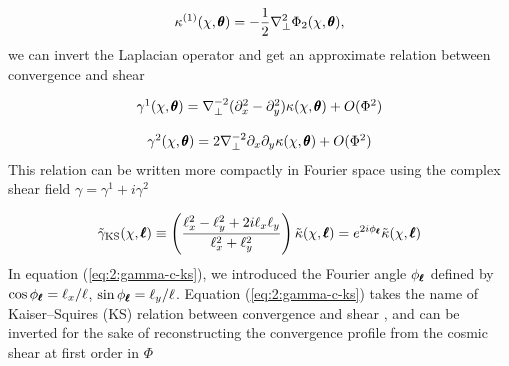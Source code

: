 \begin{equation}
\label{eq:2:kappa-1-lapl}
\kappa^{(1)}(\chi,\pmb{\theta}) = -\frac{1}{2}\nabla_\perp^2 \Phi_2(\chi,\pmb{\theta}),
\end{equation}
%
we can invert the Laplacian operator and get an approximate relation between convergence and shear

\begin{equation}
\label{eq:2:gamma-1-lapl}
\begin{matrix}
\gamma^1(\chi,\pmb{\theta}) = \nabla_\perp^{-2} (\partial_x^2-\partial_y^2) \kappa(\chi,\pmb{\theta}) + O(\Phi^2) \\ \\
\gamma^2(\chi,\pmb{\theta}) = 2\nabla_\perp^{-2} \partial_x\partial_y \kappa(\chi,\pmb{\theta}) + O(\Phi^2)
\end{matrix}
\end{equation}
%
This relation can be written more compactly in Fourier space using the complex shear field $\gamma=\gamma^1+i\gamma^2$  

\begin{equation}
\label{eq:2:gamma-c-ks}
\tilde{\gamma}_{\rm KS}(\chi,\pmb{\ell}) \equiv \left(\frac{\ell_x^2-\ell_y^2+2i\ell_x\ell_y}{\ell_x^2+\ell_y^2}\right) \tilde{\kappa}(\chi,\pmb{\ell}) = e^{2i\phi_{\pmb{\ell}}} \tilde{\kappa}(\chi,\pmb{\ell})
\end{equation}
%
In equation (\ref{eq:2:gamma-c-ks}), we introduced the Fourier angle $\phi_{\pmb{\ell}}$ defined by $\cos \phi_{\pmb{\ell}} = \ell_x/\ell$, $\sin\phi_{\pmb{\ell}}=\ell_y/\ell$. Equation (\ref{eq:2:gamma-c-ks}) takes the name of Kaiser--Squires (KS) relation between convergence and shear \citep{KaiserSquires}, and can be inverted for the sake of reconstructing the convergence profile from the cosmic shear at first order in $\Phi$

